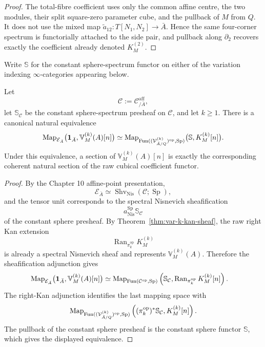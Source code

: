 \begin{proof}
The total-fibre coefficient uses only the common affine centre, the two modules, their split square-zero parameter cube, and the pullback of \(M\) from \(Q\). It does not use the mixed map \(\widetilde a_{12}:T[N_1,N_2]\to\bar A\). Hence the same four-corner spectrum is functorially attached to the side pair, and pullback along \(\partial_2\) recovers exactly the coefficient already denoted \(K_M^{(2)}\).
\end{proof}

Write \(\mathbb S\) for the constant sphere-spectrum functor on either of the variation indexing \(\infty\)-categories appearing below.

\begin{lemma}
\label{lem:var-global-sections-right-kan}
Let
\[
    \mathcal C:=\mathcal C^{\mathrm{aff}}_{/\bar A},
\]
let \(\mathbb S_{\mathcal C}\) be the constant sphere-spectrum presheaf on \(\mathcal C\), and let \(k\ge1\). There is a canonical natural equivalence
\[
\begin{aligned}
    \operatorname{Map}_{\mathcal E_{\bar A}}
    \bigl(
      \mathbf 1_{\bar A},
      \mathbb V_M^{(k)}(A)[n]
    \bigr)
    \simeq
    \operatorname{Map}_{\operatorname{Fun}((\mathcal V^{(k)}_{\bar A/Q})^{\mathrm{op}},\operatorname{Sp})}
    \bigl(
      \mathbb S,
      K_M^{(k)}[n]
    \bigr).
\end{aligned}
\]
Under this equivalence, a section of \(\mathbb V_M^{(k)}(A)[n]\) is exactly the corresponding coherent natural section of the raw cubical coefficient functor.
\end{lemma}

\begin{proof}
By the Chapter 10 affine-point presentation,
\[
    \mathcal E_{\bar A}
    \simeq
    \operatorname{Shv}_{\mathrm{Nis}}
    (\mathcal C;\operatorname{Sp}),
\]
and the tensor unit corresponds to the spectral Nisnevich sheafification
\[
    a_{\mathrm{Nis}}^{\operatorname{Sp}}\mathbb S_{\mathcal C}
\]
of the constant sphere presheaf. By Theorem~\ref{thm:var-k-kan-sheaf}, the raw right Kan extension
\[
    \operatorname{Ran}_{\pi_k^{\mathrm{op}}}K_M^{(k)}
\]
is already a spectral Nisnevich sheaf and represents \(\mathbb V_M^{(k)}(A)\). Therefore the sheafification adjunction gives
\[
\begin{aligned}
    \operatorname{Map}_{\mathcal E_{\bar A}}
    \bigl(
      \mathbf 1_{\bar A},
      \mathbb V_M^{(k)}(A)[n]
    \bigr)
    &\simeq
    \operatorname{Map}_{\operatorname{Fun}(\mathcal C^{\mathrm{op}},\operatorname{Sp})}
    \left(
      \mathbb S_{\mathcal C},
      \operatorname{Ran}_{\pi_k^{\mathrm{op}}}K_M^{(k)}[n]
    \right).
\end{aligned}
\]
The right-Kan adjunction identifies the last mapping space with
\[
    \operatorname{Map}_{\operatorname{Fun}((\mathcal V^{(k)}_{\bar A/Q})^{\mathrm{op}},\operatorname{Sp})}
    \left(
      (\pi_k^{\mathrm{op}})^*\mathbb S_{\mathcal C},
      K_M^{(k)}[n]
    \right).
\]
The pullback of the constant sphere presheaf is the constant sphere functor \(\mathbb S\), which gives the displayed equivalence.
\end{proof}

